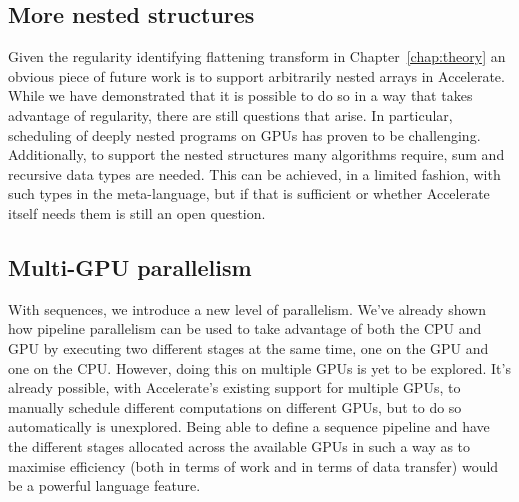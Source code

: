 \subsection{More nested structures}

Given the regularity identifying flattening transform in Chapter~\ref{chap:theory} an obvious piece of future work is to support arbitrarily nested arrays in Accelerate. While we have demonstrated that it is possible to do so in a way that takes advantage of regularity, there are still questions that arise. In particular, scheduling of deeply nested programs on GPUs has proven to be challenging\cite{bergstrom:ndp2gpu}. Additionally, to support the nested structures many algorithms require, sum and recursive data types are needed. This can be achieved, in a limited fashion, with such types in the meta-language, but if that is sufficient or whether Accelerate itself needs them is still an open question.

\subsection{Multi-GPU parallelism}

With sequences, we introduce a new level of parallelism. We've already shown how pipeline parallelism can be used to take advantage of both the CPU and GPU by executing two different stages at the same time, one on the GPU and one on the CPU. However, doing this on multiple GPUs is yet to be explored. It's already possible, with Accelerate's existing support for multiple GPUs, to manually schedule different computations on different GPUs, but to do so automatically is unexplored. Being able to define a sequence pipeline and have the different stages allocated across the available GPUs in such a way as to maximise efficiency (both in terms of work and in terms of data transfer) would be a powerful language feature.